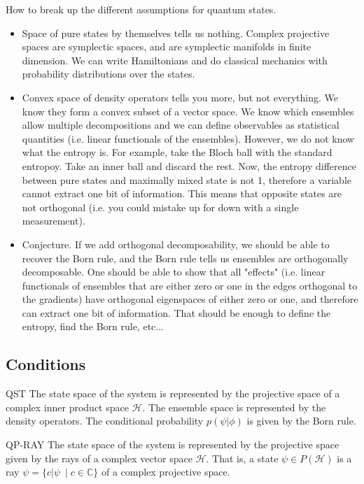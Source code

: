 How to break up the different assumptions for quantum states.
\begin{itemize}
	\item[QP] Space of pure states by themselves tells us nothing. Complex projective spaces are symplectic spaces, and are symplectic manifolds in finite dimension. We can write Hamiltonians and do classical mechanics with probability distributions over the states.
	\item[QE] Convex space of density operators tells you more, but not everything. We know they form a convex subset of a vector space. We know which ensembles allow multiple decompositions and we can define observables as statistical quantities (i.e. linear functionals of the ensembles). However, we do not know what the entropy is. For example, take the Bloch ball with the standard entropoy. Take an inner ball and discard the rest. Now, the entropy difference between pure states and maximally mixed state is not 1, therefore a variable cannot extract one bit of information. This means that opposite states are not orthogonal (i.e. you could mistake up for down with a single measurement).
	\item[BR] Conjecture. If we add orthogonal decomposability, we should be able to recover the Born rule, and the Born rule tells us ensembles are orthogonally decomposable. One should be able to show that all "effects" (i.e. linear functionals of ensembles that are either zero or one in the edges orthogonal to the gradients) have orthogonal eigenspaces of either zero or one, and therefore can extract one bit of information. That should be enough to define the entropy, find the Born rule, etc...
\end{itemize}

\subsection{Conditions}

\begin{condition}{QST}
	The state space of the system is represented by the projective space of a complex inner product space $\mathcal{H}$. The ensemble space is represented by the density operators. The conditional probability $p(\psi|\phi)$ is given by the Born rule.
\end{condition}

\begin{condition}{QP-RAY}
	The state space of the system is represented by the projective space given by the rays of a complex vector space $\mathcal{H}$. That is, a state $\psi \in P(\mathcal{H})$ is a ray $\psi = \{c |\psi\> \mid c \in \mathbb{C} \}$ of a complex projective space.
\end{condition}

